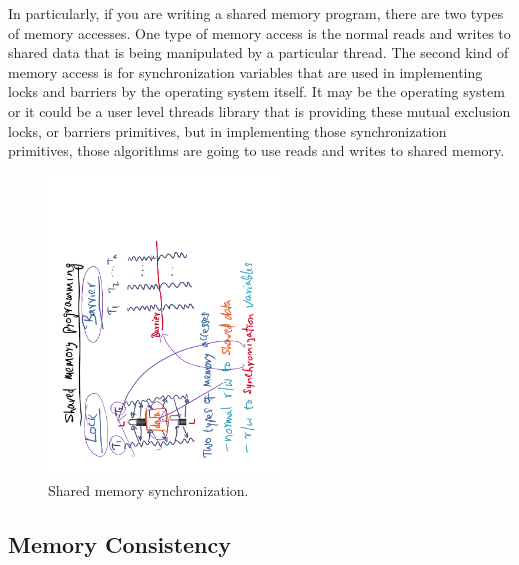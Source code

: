 \documentclass[11pt]{lecture}
\def\fullsize{0.55\textwidth}
\begin{document}
In particularly, if you are writing a shared memory program, there are 
two types of memory accesses. One type of memory access is the normal reads 
and writes to shared data that is being manipulated by a particular thread. The second kind of memory access is for synchronization variables that are 
used in implementing locks and barriers by the operating system itself. It 
may be the operating system or it could be a user level threads library that 
is providing these mutual exclusion locks, or barriers primitives, but in implementing those synchronization primitives, those algorithms are going to 
use reads and writes to shared memory. 


\begin{figure}
\centering
\includegraphics[width=\fullsize,angle=-90]{Figures/smp}
\caption{Shared memory synchronization.}\label{fig: smp}
\end{figure}

\subsection{Memory Consistency}\label{subsec: mem-consistency}
\end{document}

